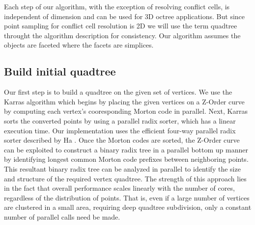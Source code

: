 \documentclass[final,3p,times,twocolumn]{elsarticle}
\begin{document}
Each step of our algorithm, with the exception of resolving conflict cells, is independent of dimension and can be used for 3D octree applications. But since point sampling for conflict cell resolution is 2D we will use the term quadtree throught the algorithm description for consistency. Our algorithm assumes the objects are faceted where the facets are simplices.

\subsection{Build initial quadtree}
\label{sec:build-initial-quadtree}
Our first step is to build a quadtree on the given set of vertices. We use the Karras algorithm \cite{karras2012maximizing} which begins by placing the given vertices on a Z-Order curve by computing each vertex's cooresponding Morton code in parallel. Next, Karras sorts the converted points by using a parallel radix sorter, which has a linear execution time. Our implementation uses the efficient four-way parallel radix sorter described by Ha \etal {}. Once the Morton codes are sorted, the Z-Order curve can be exploited to construct a binary radix tree in a parallel bottom up manner by identifying longest common Morton code prefixes between neighboring points. This resultant binary radix tree can be analyzed in parallel to identify the size and structure of the required vertex quadtree. The strength of this approach lies in the fact that overall performance scales linearly with the number of cores, regardless of the distribution of points. That is, even if a large number of vertices are clustered in a small area, requiring deep quadtree subdivision, only a constant number of parallel calls need be made.

\end{document}
